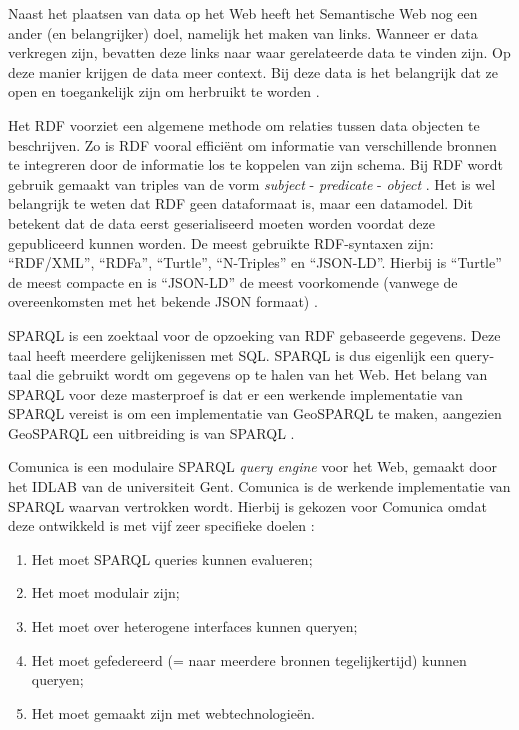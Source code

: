 \documentclass[twocolumn]{phdsymp} %
\begin{document}
Naast het plaatsen van data op het Web heeft het Semantische Web nog een ander (en belangrijker) doel, namelijk het maken van links. Wanneer er data verkregen zijn, bevatten deze links naar waar gerelateerde data te vinden zijn. Op deze manier krijgen de data meer context. Bij deze data is het belangrijk dat ze open en toegankelijk zijn om herbruikt te worden \cite{berners2006linkeddata}.

Het RDF voorziet een algemene methode om relaties tussen data objecten te beschrijven. Zo is RDF vooral efficiënt om informatie van verschillende bronnen te integreren door de informatie los te koppelen van zijn schema. Bij RDF wordt gebruik gemaakt van triples van de vorm \textit{subject} - \textit{predicate} - \textit{object} \cite{lassila1998resource}. Het is wel belangrijk te weten dat RDF geen dataformaat is, maar een datamodel. Dit betekent dat de data eerst geserialiseerd moeten worden voordat deze gepubliceerd kunnen worden. De meest gebruikte RDF-syntaxen zijn: ``RDF/XML'', ``RDFa'', ``Turtle'', ``N-Triples'' en ``JSON-LD''. Hierbij is ``Turtle'' de meest compacte en is ``JSON-LD'' de meest voorkomende (vanwege de overeenkomsten met het bekende JSON formaat) \cite{heath2011linked}.

SPARQL is een zoektaal voor de opzoeking van RDF gebaseerde gegevens. Deze taal heeft meerdere gelijkenissen met SQL. SPARQL is dus eigenlijk een query-taal die gebruikt wordt om gegevens op te halen van het Web. Het belang van SPARQL voor deze masterproef is dat er een werkende implementatie van SPARQL vereist is om een implementatie van GeoSPARQL te maken, aangezien GeoSPARQL een uitbreiding is van SPARQL \cite{sparql2013querylanguage}.

Comunica is een modulaire SPARQL \textit{query engine} voor het Web, gemaakt door het IDLAB van de universiteit Gent. Comunica is de werkende implementatie van SPARQL waarvan vertrokken wordt. Hierbij is gekozen voor Comunica omdat deze ontwikkeld is met vijf zeer specifieke doelen \cite{taelman2018comunica}:
\begin{enumerate}
    \item Het moet SPARQL queries kunnen evalueren;
    \item Het moet modulair zijn;
    \item Het moet over heterogene interfaces kunnen queryen;
    \item Het moet gefedereerd (= naar meerdere bronnen tegelijkertijd) kunnen queryen;
    \item Het moet gemaakt zijn met webtechnologieën.
\end{enumerate}
\end{document}
